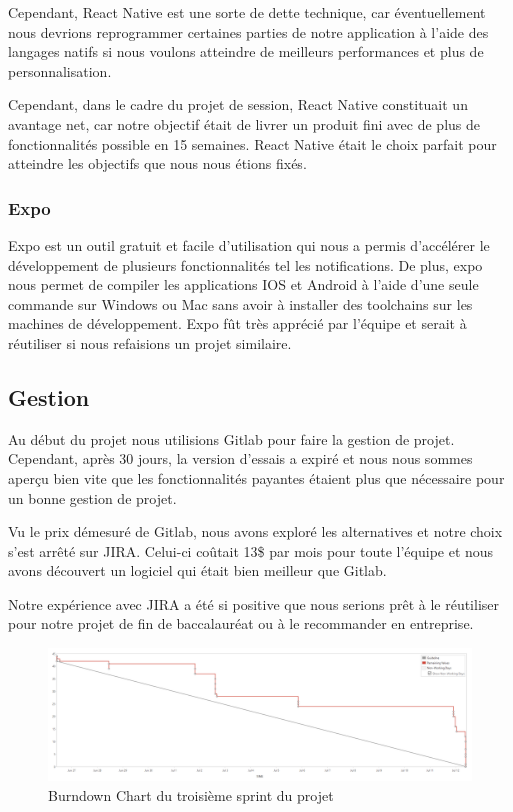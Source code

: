         Cependant, React Native est une sorte de dette technique, car éventuellement nous devrions reprogrammer certaines parties de notre application à l'aide des langages natifs si nous voulons atteindre de meilleurs performances et plus de personnalisation.

        Cependant, dans le cadre du projet de session, React Native constituait un avantage net, car notre objectif était de livrer un produit fini avec de plus de fonctionnalités possible en 15 semaines. React Native était le choix parfait pour atteindre les objectifs que nous nous étions fixés.

        \subsubsection{Expo}
        Expo est un outil gratuit et facile d'utilisation qui nous a permis d'accélérer le développement de plusieurs fonctionnalités tel les notifications. De plus, expo nous permet de compiler les applications IOS et Android à l'aide d'une seule commande sur Windows ou Mac sans avoir à installer des toolchains sur les machines de développement. Expo fût très apprécié par l'équipe et serait à réutiliser si nous refaisions un projet similaire.
        
    \subsection{Gestion}
    Au début du projet nous utilisions Gitlab pour faire la gestion de projet. Cependant, après 30 jours, la version d'essais a expiré et nous nous sommes aperçu bien vite que les fonctionnalités payantes étaient plus que nécessaire pour un bonne gestion de projet.

    Vu le prix démesuré de Gitlab, nous avons exploré les alternatives et notre choix s'est arrêté sur JIRA. Celui-ci coûtait 13\$ par mois pour toute l'équipe et nous avons découvert un logiciel qui était bien meilleur que Gitlab.

    Notre expérience avec JIRA a été si positive que nous serions prêt à le réutiliser pour notre projet de fin de baccalauréat ou à le recommander en entreprise.

    \begin{figure}[hp] \centering
        \includegraphics[width=\textwidth]{Figures/burndown}
        \caption{Burndown Chart du troisième sprint du projet}
        \label{fig.burndown}
    \end{figure}

